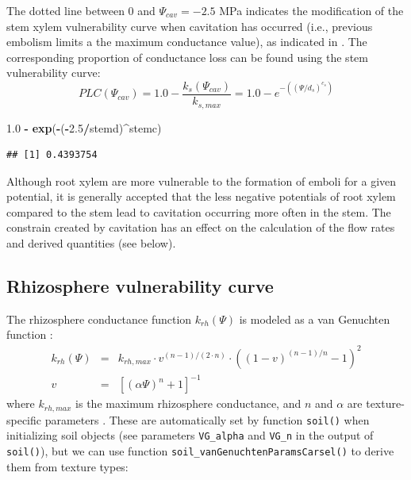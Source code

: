 \documentclass[]{book}
\newenvironment{Shaded}{\begin{snugshade}}{\end{snugshade}}
\newcommand{\KeywordTok}[1]{\textcolor[rgb]{0.13,0.29,0.53}{\textbf{#1}}}
\newcommand{\FloatTok}[1]{\textcolor[rgb]{0.00,0.00,0.81}{#1}}
\newcommand{\StringTok}[1]{\textcolor[rgb]{0.31,0.60,0.02}{#1}}
\newcommand{\OperatorTok}[1]{\textcolor[rgb]{0.81,0.36,0.00}{\textbf{#1}}}
\newcommand{\NormalTok}[1]{#1}
\begin{document}
The dotted line between 0 and \(\Psi_{cav} = -2.5\) MPa indicates the modification of the stem xylem vulnerability curve when cavitation has occurred (i.e., previous embolism limits a the maximum conductance value), as indicated in \citet{Sperry2016}. The corresponding proportion of conductance loss can be found using the stem vulnerability curve:
\begin{equation}
PLC(\Psi_{cav}) = 1.0 - \frac{k_s(\Psi_{cav})}{k_{s,max}} = 1.0 - e^{-((\Psi/{d_s})^{c_s})}
\end{equation}

\begin{Shaded}
\begin{Highlighting}[]
\FloatTok{1.0} \OperatorTok{-}\StringTok{ }\KeywordTok{exp}\NormalTok{(}\OperatorTok{-}\NormalTok{(}\OperatorTok{-}\FloatTok{2.5}\OperatorTok{/}\NormalTok{stemd)}\OperatorTok{^}\NormalTok{stemc)}
\end{Highlighting}
\end{Shaded}

\begin{verbatim}
## [1] 0.4393754
\end{verbatim}

Although root xylem are more vulnerable to the formation of emboli for a given potential, it is generally accepted that the less negative potentials of root xylem compared to the stem lead to cavitation occurring more often in the stem. The constrain created by cavitation has an effect on the calculation of the flow rates and derived quantities (see below).

\hypertarget{rhizosphere-vulnerability-curve}{%
\subsection{Rhizosphere vulnerability curve}\label{rhizosphere-vulnerability-curve}}

The rhizosphere conductance function \(k_{rh}(\Psi)\) is modeled as a van Genuchten function \citep{Genuchten1980}:
\begin{eqnarray}
k_{rh}(\Psi) &=& k_{rh,max} \cdot v^{(n-1)/(2\cdot n)} \cdot ((1-v)^{(n-1)/n}-1)^2 \\
v &=& [(\alpha \Psi)^{n}+1]^{-1}
\label{eq:rhizovulnerability}
\end{eqnarray}
where \(k_{rh,max}\) is the maximum rhizosphere conductance, and \(n\) and \(\alpha\) are texture-specific parameters \citep{Leij1996, Carsel1988}. These are automatically set by function \texttt{soil()} when initializing soil objects (see parameters \texttt{VG\_alpha} and \texttt{VG\_n} in the output of \texttt{soil()}), but we can use function \texttt{soil\_vanGenuchtenParamsCarsel()} to derive them from texture types:
\end{document}

